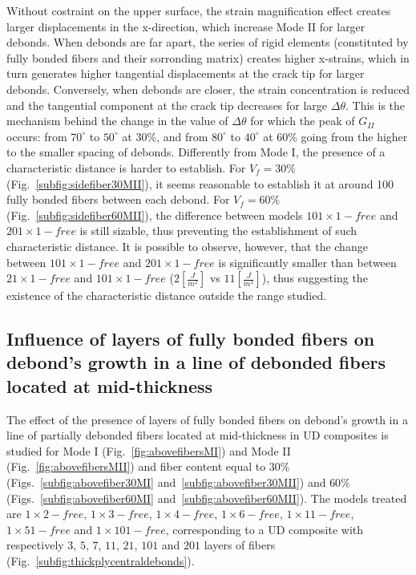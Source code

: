 \documentclass[review]{elsarticle}
\begin{document}
Without costraint on the upper surface, the strain magnification effect creates larger displacements in the x-direction, which increase Mode II for larger debonds. When debonds are far apart, the series of rigid elements (constituted by fully bonded fibers and their sorronding matrix) creates higher x-strains, which in turn generates higher tangential displacements at the crack tip for larger debonds. Conversely, when debonds are closer, the strain concentration is reduced and the tangential component at the crack tip decreases for large $\Delta\theta$. This is the mechanism behind the change in the value of $\Delta\theta$ for which the peak of $G_{II}$ occurs: from $70^{\circ}$ to $50^{\circ}$ at $30\%$, and from $80^{\circ}$ to $40^{\circ}$ at $60\%$ going from the higher to the smaller spacing of debonds. Differently from Mode I, the presence of a characteristic distance is harder to establish. For $V_{f}=30\%$ (Fig.~\ref{subfig:sidefiber30MII}), it seems reasonable to establish it at around 100 fully bonded fibers between each debond. For $V_{f}=60\%$ (Fig.~\ref{subfig:sidefiber60MII}), the difference between models $101\times 1-free$ and $201\times 1-free$ is still sizable, thus preventing the establishment of such characteristic distance. It is possible to observe, however, that the change between $101\times 1-free$ and $201\times 1-free$ is significantly smaller than between $21\times 1-free$ and $101\times 1-free$ ($2\left[\frac{J}{m^{2}}\right]$ vs $11\left[\frac{J}{m^{2}}\right]$), thus suggesting the existence of the characteristic distance outside the range studied.

\subsection{Influence of layers of fully bonded fibers on debond's growth in a line of debonded fibers located at mid-thickness}

The effect of the presence of layers of fully bonded fibers on debond's growth in a line of partially debonded fibers located at mid-thickness in UD composites is studied for Mode I (Fig.~\ref{fig:abovefibersMI}) and Mode II (Fig.~\ref{fig:abovefibersMII}) and fiber content equal to $30\%$ (Figs.~\ref{subfig:abovefiber30MI} and~\ref{subfig:abovefiber30MII}) and $60\%$ (Figs.~\ref{subfig:abovefiber60MI} and~\ref{subfig:abovefiber60MII}). The models treated are $1\times2-free$, $1\times3-free$, $1\times4-free$, $1\times6-free$, $1\times11-free$, $1\times51-free$ and $1\times101-free$, corresponding to a UD composite with respectively $3$, $5$, $7$, $11$, $21$, $101$ and $201$ layers of fibers (Fig.~\ref{subfig:thickplycentraldebonds}).
\end{document}
